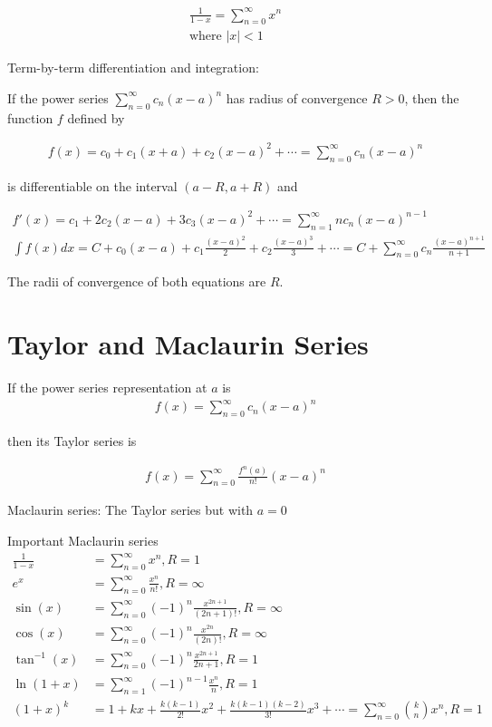 \documentclass{article}
\begin{document}
\begin{gather*}
    \frac{1}{1-x} = \sum_{n=0}^\infty x^n \\
    \text{where } |x| < 1
\end{gather*}

Term-by-term differentiation and integration:

If the power series $\sum_{n=0}^\infty c_n (x - a)^n$ has radius of convergence $R > 0$, then the function $f$ defined by

\begin{gather*}
    f(x) = c_0 + c_1(x+a) + c_2(x-a)^2 + \cdots = \sum_{n=0}^\infty c_n (x - a)^n
\end{gather*}

is differentiable on the interval $(a - R, a + R)$ and

\begin{gather*}
    f'(x) = c_1 + 2 c_2 (x - a) + 3 c_3 (x - a)^2 + \cdots = \sum_{n=1}^\infty n c_n (x - a)^{n-1} \\
    \int f(x) dx = C + c_0 (x - a) + c_1 \frac{(x-a)^2}{2} + c_2 \frac{(x-a)^3}{3} + \cdots = C + \sum_{n=0}^\infty c_n \frac{(x - a)^{n+1}}{n + 1}
\end{gather*}

The radii of convergence of both equations are $R$.

\section{Taylor and Maclaurin Series}

If the power series representation at $a$ is
\begin{gather*}
    f(x) = \sum_{n=0}^\infty c_n (x - a)^n
\end{gather*}

then its Taylor series is 

\begin{gather*}
    f(x) = \sum_{n=0}^\infty \frac{f^{n}(a)}{n!} (x - a)^n
\end{gather*}

Maclaurin series: The Taylor series but with $a = 0$

Important Maclaurin series
\begin{align*}
    \frac{1}{1-x} &= \sum_{n=0}^\infty x^n, R = 1 \\
    e^x &= \sum_{n=0}^\infty \frac{x^n}{n!}, R = \infty \\
    \sin(x) &= \sum_{n=0}^\infty (-1)^n \frac{x^{2n+1}}{(2n+1)!}, R = \infty \\
    \cos(x) &= \sum_{n=0}^\infty (-1)^n \frac{x^{2n}}{(2n)!}, R = \infty \\
    \tan^{-1}(x) &= \sum_{n=0}^\infty (-1)^n \frac{x^{2n+1}}{2n+1}, R = 1 \\
    \ln(1 + x) &= \sum_{n=1}^\infty (-1)^{n-1} \frac{x^n}{n}, R = 1 \\
    (1 + x)^k &= 1 + kx + \frac{k(k-1)}{2!}x^2 + \frac{k(k-1)(k-2)}{3!}x^3 + \cdots = \sum_{n=0}^\infty {k \choose n} x^n, R = 1
\end{align*}
\end{document}
